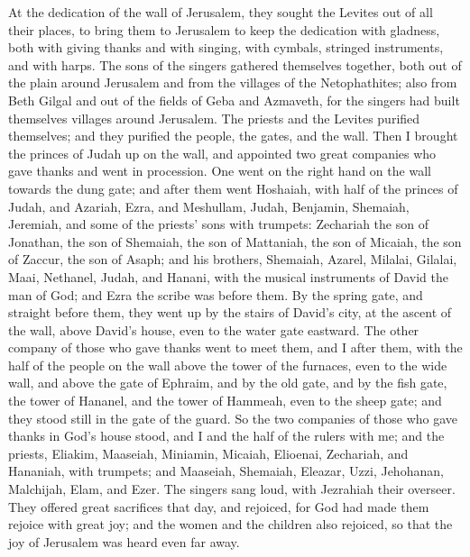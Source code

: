  At the dedication of the wall of Jerusalem, they sought
the Levites out of all their places, to bring them to Jerusalem to keep
the dedication with gladness, both with giving thanks and with singing,
with cymbals, stringed instruments, and with harps.  The
sons of the singers gathered themselves together, both out of the plain
around Jerusalem and from the villages of the Netophathites;
 also from Beth Gilgal and out of the fields of Geba and
Azmaveth, for the singers had built themselves villages around
Jerusalem.  The priests and the Levites purified
themselves; and they purified the people, the gates, and the wall.
 Then I brought the princes of Judah up on the wall, and
appointed two great companies who gave thanks and went in procession.
One went on the right hand on the wall towards the dung gate;
 and after them went Hoshaiah, with half of the princes
of Judah,  and Azariah, Ezra, and Meshullam,
 Judah, Benjamin, Shemaiah, Jeremiah,  and
some of the priests' sons with trumpets: Zechariah the son of Jonathan,
the son of Shemaiah, the son of Mattaniah, the son of Micaiah, the son
of Zaccur, the son of Asaph;  and his brothers, Shemaiah,
Azarel, Milalai, Gilalai, Maai, Nethanel, Judah, and Hanani, with the
musical instruments of David the man of God; and Ezra the scribe was
before them.  By the spring gate, and straight before
them, they went up by the stairs of David's city, at the ascent of the
wall, above David's house, even to the water gate eastward.
 The other company of those who gave thanks went to meet
them, and I after them, with the half of the people on the wall above
the tower of the furnaces, even to the wide wall,  and
above the gate of Ephraim, and by the old gate, and by the fish gate,
the tower of Hananel, and the tower of Hammeah, even to the sheep gate;
and they stood still in the gate of the guard.  So the
two companies of those who gave thanks in God's house stood, and I and
the half of the rulers with me;  and the priests,
Eliakim, Maaseiah, Miniamin, Micaiah, Elioenai, Zechariah, and Hananiah,
with trumpets;  and Maaseiah, Shemaiah, Eleazar, Uzzi,
Jehohanan, Malchijah, Elam, and Ezer. The singers sang loud, with
Jezrahiah their overseer.  They offered great sacrifices
that day, and rejoiced, for God had made them rejoice with great joy;
and the women and the children also rejoiced, so that the joy of
Jerusalem was heard even far away.

